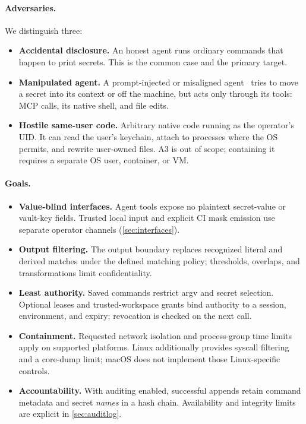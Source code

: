 \documentclass[10pt,twocolumn]{article}
\begin{document}
\paragraph{Adversaries.} We distinguish three:
\begin{itemize}
\item[\textbf{A1}] \textbf{Accidental disclosure.} An honest agent runs
  ordinary commands that happen to print secrets. This is the common case and
  the primary target.
\item[\textbf{A2}] \textbf{Manipulated agent.} A prompt-injected or misaligned
  agent~\citep{greshake2023youve} tries to move a secret into its context or
  off the machine, but acts only through its tools: MCP calls, its native shell,
  and file edits.
\item[\textbf{A3}] \textbf{Hostile same-user code.} Arbitrary native code
  running as the operator's UID. It can read the user's keychain, attach to
  processes where the OS permits, and rewrite user-owned files. A3 is out of
  scope; containing it requires a separate OS user, container, or VM.
\end{itemize}

\paragraph{Goals.}
\begin{itemize}
\item[\textbf{G1}] \textbf{Value-blind interfaces.} Agent tools expose no
  plaintext secret-value or vault-key fields. Trusted local input and explicit
  CI mask emission use separate operator channels (\cref{sec:interfaces}).
\item[\textbf{G2}] \textbf{Output filtering.} The output boundary replaces
  recognized literal and derived matches under the defined matching policy;
  thresholds, overlaps, and transformations limit confidentiality.
\item[\textbf{G3}] \textbf{Least authority.} Saved commands restrict argv and
  secret selection. Optional leases and trusted-workspace grants bind authority
  to a session, environment, and expiry; revocation is checked on the next call.
\item[\textbf{G4}] \textbf{Containment.} Requested network isolation and
  process-group time limits apply on supported platforms. Linux additionally
  provides syscall filtering and a core-dump limit; macOS does not implement
  those Linux-specific controls.
\item[\textbf{G5}] \textbf{Accountability.} With auditing enabled, successful
  appends retain command metadata and secret \emph{names} in a hash chain.
  Availability and integrity limits are explicit in \cref{sec:auditlog}.
\end{itemize}
\end{document}
